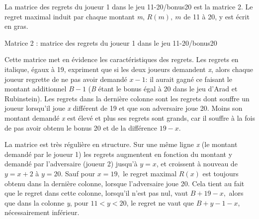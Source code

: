 \begin{Article}
\begin{refsection}[UmbhauerFR]
La matrice des regrets du joueur 1 dans le jeu 11-20/bonus20 est la
matrice 2. Le regret maximal induit par chaque montant \emph{m},
\(R(m),\ m\) de 11 à 20, y est écrit en gras.

\begin{table}[h!]
\centering
Matrice 2 : matrice des regrets du joueur 1 dans le jeu 11-20/bonus20 \par
\vspace{0.2cm}
\label{matrice2}
\end{table}

Cette matrice met en évidence les caractéristiques des regrets. Les
regrets en italique, égaux à 19, expriment que si les deux joueurs
demandent \emph{x}, alors chaque joueur regrette de ne pas avoir demandé
\(x - 1\): il aurait gagné ce faisant le montant additionnel \(B - 1\)
(\emph{B} étant le bonus égal à 20 dans le jeu d'Arad et Rubinstein).
Les regrets dans la dernière colonne sont les regrets dont souffre un
joueur lorsqu'il joue \emph{x} différent de 19 et que son adversaire
joue 20. Moins son montant demandé \emph{x} est élevé et plus ses
regrets sont grands, car il souffre à la fois de pas avoir obtenu le
bonus 20 et de la différence \(19 - x\).

La matrice est très régulière en structure. Sur une même ligne \emph{x}
(le montant demandé par le joueur 1) les regrets augmentent en fonction
du montant y demandé par l'adversaire (joueur 2) jusqu'à \(y = x\), et
croissent à nouveau de \(y = x + 2\) à \(y = 20\). Sauf pour \(x = 19,\)
le regret maximal \(R(x)\) est toujours obtenu dans la dernière colonne,
lorsque l'adversaire joue 20. Cela tient au fait que le regret dans
cette colonne, lorsqu'il n'est pas nul, vaut \(B + 19 - x,\) alors que
dans la colonne \emph{y}, pour \(11 < y < 20\), le regret ne vaut que
\(B + y - 1 - x\), nécessairement inférieur.


\end{refsection}
\end{Article}
